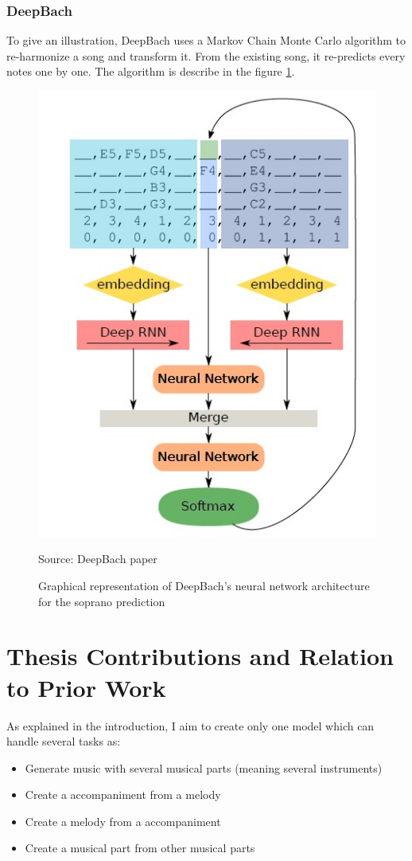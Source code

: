 \documentclass[12pt]{report}
\begin{document}
\subsubsection{DeepBach}

To give an illustration, DeepBach \cite{hadjeres_deepbach:_2016} uses a Markov Chain Monte Carlo algorithm to re-harmonize a song and transform it. 
From the existing song, it re-predicts every notes one by one.
The algorithm is describe in the figure \ref{fig:relatedworks:deepbach_architecture}.

\begin{figure}[htbp]
     \centering
     \includegraphics[width=.5\linewidth]{images/related_works/deepbach/deepbach_algo.jpg}
     \caption{Graphical representation of DeepBach's neural network architecture for the soprano prediction}
     Source: DeepBach paper \cite{hadjeres_deepbach:_2016}
     \label{fig:relatedworks:deepbach_architecture}
\end{figure}

\section{Thesis Contributions and Relation to Prior Work}

As explained in the introduction, I aim to create only one model which can handle several tasks as:
\begin{itemize}
    \item Generate music with several musical parts (meaning several instruments)
    \item Create a accompaniment from a melody
    \item Create a melody from a accompaniment
    \item Create a musical part from other musical parts
\end{itemize}
\end{document}

